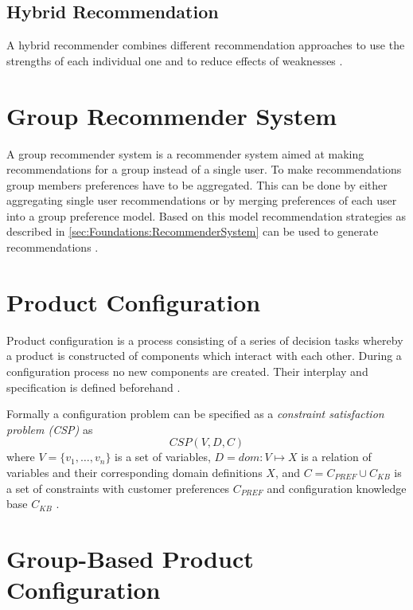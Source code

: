 \subsection{Hybrid Recommendation}
A hybrid recommender combines different recommendation approaches to use the strengths of each individual one and to reduce effects of weaknesses \cite{burkeHybridRecommenderSystems2002}.

\section{Group Recommender System}

A group recommender system is a recommender system aimed at making recommendations for a group instead of a single user. To make recommendations group members preferences have to be aggregated. This can be done by either aggregating single user recommendations or by merging preferences of each user into a group preference model. Based on this model recommendation strategies as described in \ref{sec:Foundations:RecommenderSystem} can be used to generate recommendations \cite{jamesonRecommendationGroups2007}.

\section{Product Configuration}
\label{sec:Foundations:ProductConfiguration}

Product configuration is a process consisting of a series of decision tasks whereby a product is constructed of components which interact with each other. During a configuration process no new components are created. Their interplay and specification is defined beforehand \cite[~ pp. 42, 43]{sabinProductConfigurationFrameworksa1998}.

Formally a configuration problem can be specified as a \emph{constraint satisfaction problem (CSP)} \cite{tsangFoundationsConstraintSatisfaction1993} as 
\[
    CSP(V,D,C)
\]
where \( V = \{v_1,\dots, v_n\} \) is a set of variables, \( D = dom : V \mapsto X \) is a relation of variables and their corresponding domain definitions \( X \), and \( C = C_{PREF} \cup C_{KB} \) is a set of constraints with customer preferences \( C_{PREF} \) and configuration knowledge base \( C_{KB} \) \cite{felferningGroupBasedConfiguration2016, felfernigOpenConfiguration2014}.


\section{Group-Based Product Configuration}
\label{sec:Foundations:GroupBasedProductConfiguration}

